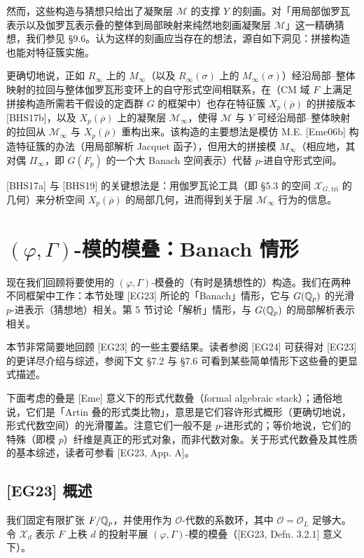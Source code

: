 然而，这些构造与猜想只给出了凝聚层 $\mathcal M$ 的支撑 $Y$ 的刻画。对「用局部伽罗瓦表示以及伽罗瓦表示叠的整体到局部映射来纯然地刻画凝聚层 $\mathcal M$」这一精确猜想，我们参见 §9.6。认为这样的刻画应当存在的想法，源自如下洞见：拼接构造也能对特征簇实施。

更确切地说，正如 $R_\infty$ 上的 $M_\infty$（以及 $R_\infty(\sigma)$ 上的 $M_\infty(\sigma)$）经沿局部--整体映射的拉回与整体伽罗瓦形变环上的自守形式空间相联系，在（CM 域 $F$ 上满足拼接构造所需若干假设的定酉群 $G$ 的框架中）也存在特征簇 $X_p(\overline{\rho})$ 的拼接版本 [BHS17b]，以及 $X_p(\overline{\rho})$ 上的凝聚层 $\mathcal M_\infty$，使得 $\mathcal M$ 与 $Y$ 可经沿局部--整体映射的拉回从 $\mathcal M_\infty$ 与 $X_p(\overline{\rho})$ 重构出来。该构造的主要想法是模仿 M.E. [Eme06b] 构造特征簇的办法（用局部解析 Jacquet 函子），但用大的拼接模 $M_\infty$（相应地，其对偶 $\Pi_\infty$，即 $G(F_p)$ 的一个大 Banach 空间表示）代替 $p$-进自守形式空间。

[BHS17a] 与 [BHS19] 的关键想法是：用伽罗瓦论工具（即 §5.3 的空间 $\mathcal X_{G,\mathrm{tri}}$ 的几何）来分析空间 $X_p(\overline{\rho})$ 的局部几何，进而得到关于层 $\mathcal M_\infty$ 行为的信息。

\section{$(\varphi,\Gamma)$-模的模叠：Banach 情形}

现在我们回顾将要使用的 $(\varphi,\Gamma)$-模叠的（有时是猜想性的）构造。我们在两种不同框架中工作：本节处理 [EG23] 所论的「Banach」情形，它与 $G(\mathbb{Q}_p)$ 的光滑 $p$-进表示（猜想地）相关。第 5 节讨论「解析」情形，与 $G(\mathbb{Q}_p)$ 的局部解析表示相关。

本节非常简要地回顾 [EG23] 的一些主要结果。读者参阅 [EG24] 可获得对 [EG23] 的更详尽介绍与综述，参阅下文 §7.2 与 §7.6 可看到某些简单情形下这些叠的更显式描述。

下面考虑的叠是 [Eme] 意义下的形式代数叠（formal algebraic stack）；通俗地说，它们是「Artin 叠的形式类比物」，意思是它们容许形式概形（更确切地说，形式代数空间）的光滑覆盖。注意它们一般不是 $p$-进形式的；等价地说，它们的特殊（即模 $p$）纤维是真正的形式对象，而非代数对象。关于形式代数叠及其性质的基本综述，读者可参看 [EG23, App. A]。

\subsection{[EG23] 概述}

我们固定有限扩张 $F/\mathbb{Q}_p$，并使用作为 $\mathcal O$-代数的系数环，其中 $\mathcal O=\mathcal O_L$ 足够大。令 $\mathcal X_d$ 表示 $F$ 上秩 $d$ 的投射平展 $(\varphi,\Gamma)$-模的模叠（[EG23, Defn. 3.2.1] 意义下）。

